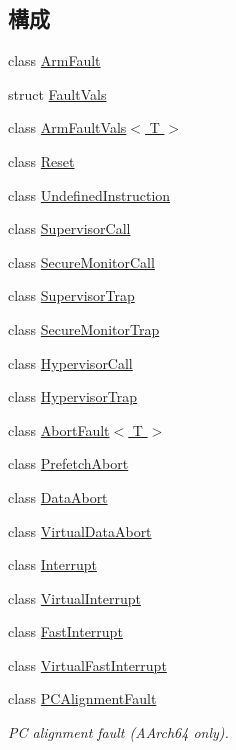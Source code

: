 \subsection*{構成}
\begin{DoxyCompactItemize}
\item 
class \hyperlink{classArmISA_1_1ArmFault}{ArmFault}
\item 
struct \hyperlink{structArmISA_1_1ArmFault_1_1FaultVals}{FaultVals}
\item 
class \hyperlink{classArmISA_1_1ArmFaultVals}{ArmFaultVals$<$ T $>$}
\item 
class \hyperlink{classArmISA_1_1Reset}{Reset}
\item 
class \hyperlink{classArmISA_1_1UndefinedInstruction}{UndefinedInstruction}
\item 
class \hyperlink{classArmISA_1_1SupervisorCall}{SupervisorCall}
\item 
class \hyperlink{classArmISA_1_1SecureMonitorCall}{SecureMonitorCall}
\item 
class \hyperlink{classArmISA_1_1SupervisorTrap}{SupervisorTrap}
\item 
class \hyperlink{classArmISA_1_1SecureMonitorTrap}{SecureMonitorTrap}
\item 
class \hyperlink{classArmISA_1_1HypervisorCall}{HypervisorCall}
\item 
class \hyperlink{classArmISA_1_1HypervisorTrap}{HypervisorTrap}
\item 
class \hyperlink{classArmISA_1_1AbortFault}{AbortFault$<$ T $>$}
\item 
class \hyperlink{classArmISA_1_1PrefetchAbort}{PrefetchAbort}
\item 
class \hyperlink{classArmISA_1_1DataAbort}{DataAbort}
\item 
class \hyperlink{classArmISA_1_1VirtualDataAbort}{VirtualDataAbort}
\item 
class \hyperlink{classArmISA_1_1Interrupt}{Interrupt}
\item 
class \hyperlink{classArmISA_1_1VirtualInterrupt}{VirtualInterrupt}
\item 
class \hyperlink{classArmISA_1_1FastInterrupt}{FastInterrupt}
\item 
class \hyperlink{classArmISA_1_1VirtualFastInterrupt}{VirtualFastInterrupt}
\item 
class \hyperlink{classArmISA_1_1PCAlignmentFault}{PCAlignmentFault}
\begin{DoxyCompactList}\small\item\em PC alignment fault (AArch64 only). \item\end{DoxyCompactList}\item 

\end{DoxyCompactItemize}
